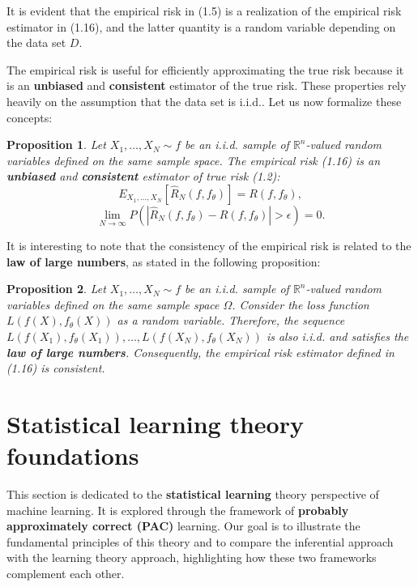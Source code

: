 \documentclass{report}
\newtheorem{proposition}{Proposition}[chapter]
\begin{document}
It is evident that the empirical risk in (1.5) is a realization of the empirical risk estimator in (1.16), and the latter quantity is a random variable depending on the data set $D$.

The empirical risk is useful for efficiently approximating the true risk because it is an \textbf{unbiased} and \textbf{consistent} estimator of the true risk. These properties rely heavily on the assumption that the data set is i.i.d.. Let us now formalize these concepts:

\begin{proposition}
Let $X_1,\dots,X_N \sim f$ be an i.i.d. sample of $\mathbb{R}^n$-valued random variables defined on the same sample space. The empirical risk (1.16) is an \textbf{unbiased} and \textbf{consistent} estimator of true risk (1.2):
\begin{equation}
 E_{X_1,...,X_N}[\hat{R}_N(f,f_\theta)] = R(f,f_\theta),
\end{equation}
\begin{equation}
 \lim_{N\to \infty}P(|\hat{R}_N(f,f_\theta)-R(f,f_\theta)| > \epsilon) = 0.
 \end{equation}
\end{proposition}

It is interesting to note that the consistency of the empirical risk is related to the \textbf{law of large numbers}, as stated in the following proposition:
\begin{proposition}
Let $X_1,\dots,X_N \sim f$ be an i.i.d. sample of $\mathbb{R}^n$-valued random variables defined on the same sample space $\Omega$. Consider the loss function $L(f(X), f_\theta(X))$ as a random variable. Therefore, the sequence $L(f(X_1),f_\theta(X_1)),\dots,L(f(X_N),f_\theta(X_N))$ is also i.i.d. and satisfies the \textbf{law of large numbers}. Consequently, the empirical risk estimator defined in (1.16) is consistent.
\end{proposition}

\section{Statistical learning theory foundations}
This section is dedicated to the \textbf{statistical learning} theory perspective of machine learning. It is explored through the framework of \textbf{probably approximately correct (PAC)} learning. Our goal is to illustrate the fundamental principles of this theory and to compare the inferential approach with the learning theory approach, highlighting how these two frameworks complement each other.
\end{document}
